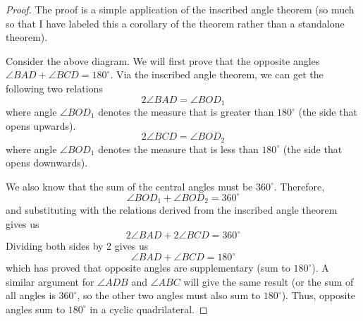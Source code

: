 \begin{proof}
The proof is a simple application of the inscribed angle theorem (so much so that I have labeled this a corollary of the theorem rather than a standalone theorem). 
\begin{center}
\end{center}
Consider the above diagram. We will first prove that the opposite angles $\angle BAD + \angle BCD = 180^{\circ}$. Via the inscribed angle theorem, we can get the following two relations
\[
2\angle BAD =  \angle BOD_1
\]
where angle $\angle BOD_1$ denotes the measure that is greater than $180^{\circ}$ (the side that opens upwards).
\[
2 \angle BCD = \angle BOD_2
\]
where angle $\angle BOD_1$ denotes the measure that is less than $180^{\circ}$ (the side that opens downwards). 

We also know that the sum of the central angles must be $360^{\circ}$. Therefore,
\[
\angle BOD_1 + \angle BOD_2 = 360^{\circ}
\]
and substituting with the relations derived from the inscribed angle theorem gives us
\[
2\angle BAD + 2\angle BCD = 360^\circ
\]
Dividing both sides by 2 gives us
\[
\angle BAD + \angle BCD = 180^{\circ}
\]
which has proved that opposite angles are supplementary (sum to $180^\circ$). A similar argument for $\angle ADB$ and $\angle ABC$ will give the same result (or the sum of all angles is $360^\circ$, so the other two angles must also sum to $180^\circ$). Thus, opposite angles sum to $180^\circ$ in a cyclic quadrilateral. 
\end{proof}

